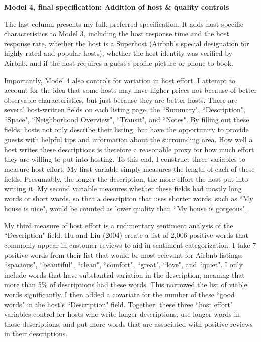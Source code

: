 \documentclass[11pt, oneside]{article}
\begin{document}
\textbf{Model 4, final specification: Addition of host \& quality controls}

The last column presents my full, preferred specification. It adds host-specific characteristics to Model 3, including the host response time and the host response rate, whether the host is a Superhost (Airbnb's special designation for highly-rated and popular hosts), whether the host identity was verified by Airbnb, and if the host requires a guest's profile picture or phone to book. 

Importantly, Model 4 also controls for variation in host effort. I attempt to account for the idea that some hosts may have higher prices not because of better observable characteristics, but just because they are better hosts. There are several host-written fields on each listing page, the ``Summary", ``Description", ``Space", ``Neighborhood Overview", ``Transit", and ``Notes". By filling out these fields, hosts not only describe their listing, but have the opportunity to provide guests with helpful tips and information about the surrounding area. How well a host writes these descriptions is therefore a reasonable proxy for how much effort they are willing to put into hosting. To this end, I construct three variables to measure host effort. My first variable simply measures the length of each of these fields. Presumably, the longer the description, the more effort the host put into writing it. My second variable measures whether these fields had mostly long words or short words, so that a description that uses shorter words, such as ``My house is nice", would be counted as lower quality than ``My house is gorgeous". 

My third measure of host effort is a rudimentary sentiment analysis of the ``Description" field. Hu and Liu (2004) create a list of 2,006 positive words that commonly appear in customer reviews to aid in sentiment categorization.\cite{hu} I take 7 positive words from their list that would be most relevant for Airbnb listings: ``spacious", ``beautiful", ``clean", ``comfort", ``great", ``love", and ``quiet". I only include words that have substantial variation in the description, meaning that more than 5\% of descriptions had these words. This narrowed the list of viable words significantly. I then added a covariate for the number of these ``good words" in the host's ``Description" field. Together, these three ``host effort" variables control for hosts who write longer descriptions, use longer words in those descriptions, and put more words that are associated with positive reviews in their descriptions. 
\end{document}
